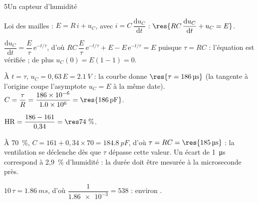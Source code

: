 \begin{corrigeBac}{5}{Un capteur d'humidité}
\begin{questions}
\item Loi des mailles : $E=R\,i+u_C$, avec $i=C\,\dfrac{\mathrm{d}u_C}{\mathrm{d}t}$ : $\res{RC\,\dfrac{\mathrm{d}u_C}{\mathrm{d}t}+u_C=E}$. \pts{1 pt}
\item $\dfrac{\mathrm{d}u_C}{\mathrm{d}t}=\dfrac{E}{\tau}\,\mathrm{e}^{-t/\tau}$, d'où $RC\,\dfrac{E}{\tau}\,\mathrm{e}^{-t/\tau}+E-E\,\mathrm{e}^{-t/\tau}=E$ puisque $\tau=RC$ :
l'équation est vérifiée ; de plus $u_C(0)=E(1-1)=0$. 
\item À $t=\tau$, $u_C=0{,}63\,E=\qty{2,1}{V}$ : la courbe donne $\res{\tau=\qty{186}{\micro s}}$ (la tangente à l'origine coupe
l'asymptote $u_C=E$ à la même date). $C=\dfrac{\tau}{R}=\dfrac{\num{186e-6}}{\num{1.0e6}}=\res{\qty{186}{pF}}$. \pts{1 pt}
\item $\mathrm{HR}=\dfrac{186-161}{0{,}34}=\res{74~\%}$. 
\item À 70~\%, $C=161+0{,}34\times70=\qty{184,8}{pF}$, d'où $\tau=RC=\res{\qty{185}{\micro s}}$ : la ventilation se déclenche dès que
$\tau$ dépasse cette valeur. Un écart de \qty{1}{\micro s} correspond à 2,9~\% d'humidité : la durée doit être mesurée
à la microseconde près. \pts{1 pt}
\item $10\,\tau=\qty{1,86}{ms}$, d'où $\dfrac{1}{\num{1.86e-3}}=538$ : environ . 
\end{questions}
\end{corrigeBac}
